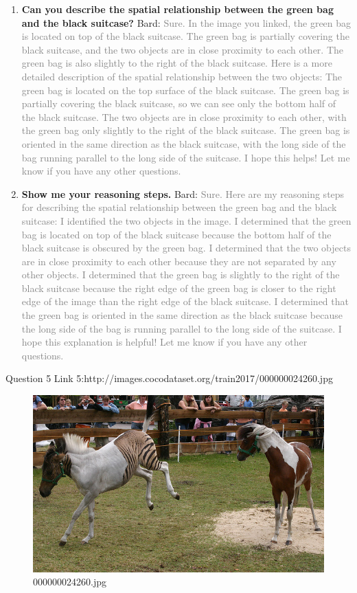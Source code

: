     \begin{enumerate}
        \item \textbf{Can you describe the spatial relationship between the green bag and the black suitcase?}
        \subitem Bard: \textcolor{gray}{ Sure. In the image you linked, the green bag is located on top of the black suitcase. The green bag is partially covering the black suitcase, and the two objects are in close proximity to each other. The green bag is also slightly to the right of the black suitcase.
        Here is a more detailed description of the spatial relationship between the two objects:
        The green bag is located on the top surface of the black suitcase.
        The green bag is partially covering the black suitcase, so we can see only the bottom half of the black suitcase.
        The two objects are in close proximity to each other, with the green bag only slightly to the right of the black suitcase.
        The green bag is oriented in the same direction as the black suitcase, with the long side of the bag running parallel to the long side of the suitcase.
        I hope this helps! Let me know if you have any other questions. }
        \item \textbf{Show me your reasoning steps.}
        \subitem Bard: \textcolor{gray}{ 
        Sure. Here are my reasoning steps for describing the spatial relationship between the green bag and the black suitcase:
        I identified the two objects in the image.
        I determined that the green bag is located on top of the black suitcase because the bottom half of the black suitcase is obscured by the green bag.
        I determined that the two objects are in close proximity to each other because they are not separated by any other objects.
        I determined that the green bag is slightly to the right of the black suitcase because the right edge of the green bag is closer to the right edge of the image than the right edge of the black suitcase.
        I determined that the green bag is oriented in the same direction as the black suitcase because the long side of the bag is running parallel to the long side of the suitcase.
        I hope this explanation is helpful! Let me know if you have any other questions. }
    \end{enumerate}
Question 5
Link 5:http://images.cocodataset.org/train2017/000000024260.jpg
    \begin{figure}[h]
        \centering
        \includegraphics[width=0.8\linewidth]{../image set/easy/000000024260.jpg}
        \caption{000000024260.jpg}
    \end{figure}

